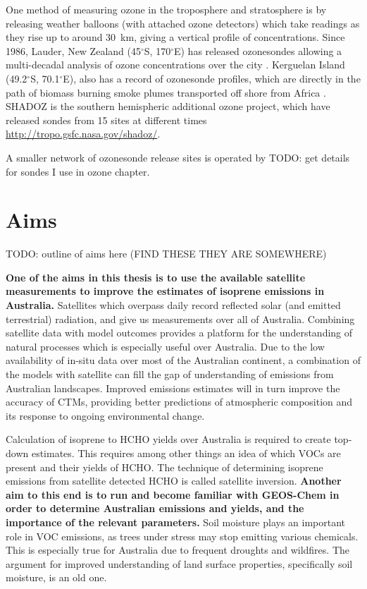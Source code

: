     One method of measuring ozone in the troposphere and stratosphere is by releasing weather balloons (with attached ozone detectors) which take readings as they rise up to around 30~km, giving a vertical profile of concentrations.
    Since 1986, Lauder, New Zealand (45$^{\circ}$S, 170$^{\circ}$E) has released ozonesondes allowing a multi-decadal analysis of ozone concentrations over the city \citep{Brinksma2002}.
    Kerguelan Island (49.2$^{\circ}$S, 70.1$^{\circ}$E), also has a record of ozonesonde profiles, which are directly in the path of biomass burning smoke plumes transported off shore from Africa \citep{Baray2012}.
    SHADOZ is the southern hemispheric additional ozone project, which have released sondes from 15 sites at different times \url{http://tropo.gsfc.nasa.gov/shadoz/}.
    
    A smaller network of ozonesonde release sites is operated by TODO: get details for sondes I use in ozone chapter.
  
\section{Aims}
\label{LR:Aims}
TODO: outline of aims here (FIND THESE THEY ARE SOMEWHERE)
  
  \textbf{One of the aims in this thesis is to use the available satellite measurements to improve the estimates of isoprene emissions in Australia.}
  Satellites which overpass daily record reflected solar (and emitted terrestrial) radiation, and give us measurements over all of Australia.
  Combining satellite data with model outcomes provides a platform for the understanding of natural processes which is especially useful over Australia.
  Due to the low availability of in-situ data over most of the Australian continent, a combination of the models with satellite can fill the gap of understanding of emissions from Australian landscapes.
  Improved emissions estimates will in turn improve the accuracy of CTMs, providing better predictions of atmospheric composition and its response to ongoing environmental change.
  
  Calculation of isoprene to HCHO yields over Australia is required to create top-down estimates.
  This requires among other things an idea of which VOCs are present and their yields of HCHO.
  The technique of determining isoprene emissions from satellite detected HCHO is called satellite inversion.
  \textbf{Another aim to this end is to run and become familiar with GEOS-Chem in order to determine Australian emissions and yields, and the importance of the relevant parameters.}
  Soil moisture plays an important role in VOC emissions, as trees under stress may stop emitting various chemicals. 
  This is especially true for Australia due to frequent droughts and wildfires.
  The argument for improved understanding of land surface properties, specifically soil moisture, is an old one\citep{Mintz1982, Rowntree1983, Chen2001}.
  
